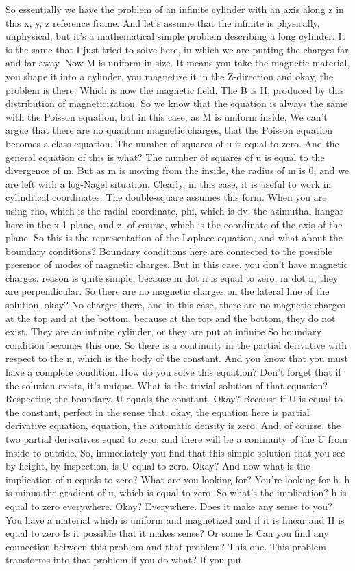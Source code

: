 So essentially we have the problem of an infinite cylinder with an axis along z in this x, y, z reference frame. And let's assume that the infinite is physically, unphysical, but it's a mathematical simple problem describing a long cylinder. It is the same that I just tried to solve here, in which we are putting the charges far and far away. Now M is uniform in size. It means you take the magnetic material, you shape it into a cylinder, you magnetize it in the Z-direction and okay, the problem is there. Which is now the magnetic field. The B is H, produced by this distribution of magneticization. So we know that the equation is always the same with the Poisson equation, but in this case, as M is uniform inside, We can't argue that there are no quantum magnetic charges, that the Poisson equation becomes a class equation. The number of squares of u is equal to zero. And the general equation of this is what? The number of squares of u is equal to the divergence of m. But as m is moving from the inside, the radius of m is 0, and we are left with a log-Nagel situation. Clearly, in this case, it is useful to work in cylindrical coordinates. The double-square assumes this form. When you are using rho, which is the radial coordinate, phi, which is dv, the azimuthal hangar here in the x-1 plane, and z, of course, which is the coordinate of the axis of the plane. So this is the representation of the Laplace equation, and what about the boundary conditions? Boundary conditions here are connected to the possible presence of modes of magnetic charges. But in this case, you don't have magnetic charges. reason is quite simple, because m dot n is equal to zero, m dot n, they are perpendicular. So there are no magnetic charges on the lateral line of the solution, okay? No charges there, and in this case, there are no magnetic charges at the top and at the bottom, because at the top and the bottom, they do not exist. They are an infinite cylinder, or they are put at infinite So boundary condition becomes this one. So there is a continuity in the partial derivative with respect to the n, which is the body of the constant. And you know that you must have a complete condition. How do you solve this equation? Don't forget that if the solution exists, it's unique. What is the trivial solution of that equation? Respecting the boundary. U equals the constant. Okay? Because if U is equal to the constant, perfect in the sense that, okay, the equation here is partial derivative equation, equation, the automatic density is zero. And, of course, the two partial derivatives equal to zero, and there will be a continuity of the U from inside to outside. So, immediately you find that this simple solution that you see by height, by inspection, is U equal to zero. Okay? And now what is the implication of u equals to zero? What are you looking for? You're looking for h. h is minus the gradient of u, which is equal to zero. So what's the implication? h is equal to zero everywhere. Okay? Everywhere. Does it make any sense to you? You have a material which is uniform and magnetized and if it is linear and H is equal to zero Is it possible that it makes sense? Or some Is Can you find any connection between this problem and that problem? This one. This problem transforms into that problem if you do what? If you put 